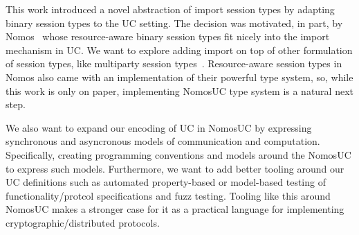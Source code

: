 This work introduced a novel abstraction of import session types by adapting binary session types to the UC setting.
The decision was motivated, in part, by Nomos~\cite{das2018work, dasnomos} whose resource-aware binary session types
fit nicely into the import mechanism in UC.
We want to explore adding import on top of other formulation of session types, like multiparty session types~\cite{Scalas19POPL}.
Resource-aware session types in Nomos also came with an implementation of their powerful type system,
so, while this work is only on paper, implementing NomosUC type system is a natural next step.

We also want to expand our encoding of UC in NomosUC by expressing synchronous and asyncronous models of communication and computation. 
Specifically, creating programming conventions and models around the NomosUC to express such models.
Furthermore, we want to add better tooling around our UC definitions such as automated property-based
or model-based testing of functionality/protcol specifications and fuzz testing. 
Tooling like this around NomosUC makes a stronger case for it as a practical language for implementing cryptographic/distributed protocols.

